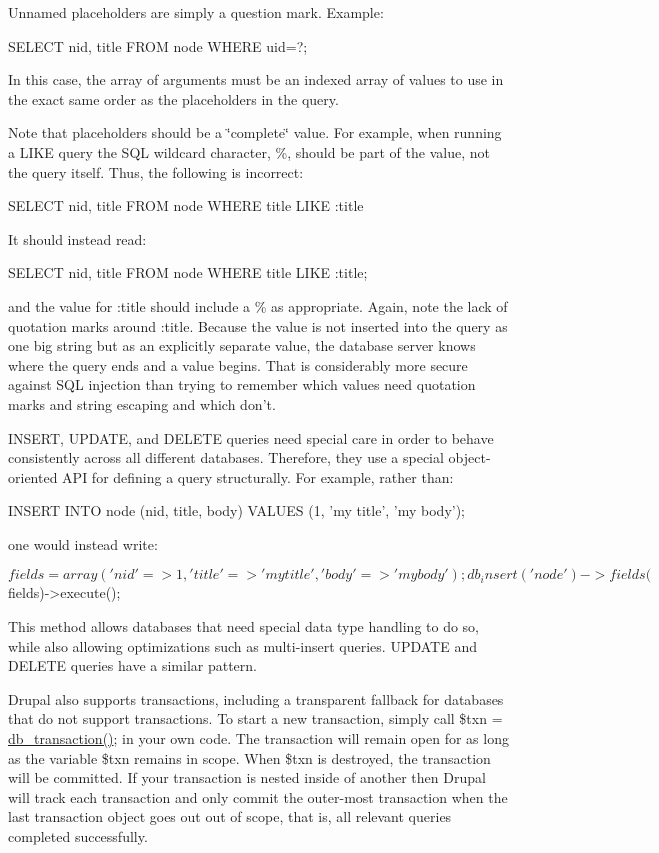 Unnamed placeholders are simply a question mark. Example: 
\begin{DoxyCode}
 SELECT nid, title FROM {node} WHERE uid=?;
\end{DoxyCode}


In this case, the array of arguments must be an indexed array of values to use in the exact same order as the placeholders in the query.

Note that placeholders should be a \char`\"{}complete\char`\"{} value. For example, when running a LIKE query the SQL wildcard character, \%, should be part of the value, not the query itself. Thus, the following is incorrect: 
\begin{DoxyCode}
 SELECT nid, title FROM {node} WHERE title LIKE :title%
\end{DoxyCode}
 It should instead read: 
\begin{DoxyCode}
 SELECT nid, title FROM {node} WHERE title LIKE :title;
\end{DoxyCode}
 and the value for :title should include a \% as appropriate. Again, note the lack of quotation marks around :title. Because the value is not inserted into the query as one big string but as an explicitly separate value, the database server knows where the query ends and a value begins. That is considerably more secure against SQL injection than trying to remember which values need quotation marks and string escaping and which don't.

INSERT, UPDATE, and DELETE queries need special care in order to behave consistently across all different databases. Therefore, they use a special object-\/oriented API for defining a query structurally. For example, rather than: 
\begin{DoxyCode}
 INSERT INTO node (nid, title, body) VALUES (1, 'my title', 'my body');
\end{DoxyCode}
 one would instead write: 
\begin{DoxyCode}
 $fields = array('nid' => 1, 'title' => 'my title', 'body' => 'my body');
 db_insert('node')->fields($fields)->execute();
\end{DoxyCode}
 This method allows databases that need special data type handling to do so, while also allowing optimizations such as multi-\/insert queries. UPDATE and DELETE queries have a similar pattern.

Drupal also supports transactions, including a transparent fallback for databases that do not support transactions. To start a new transaction, simply call \$txn = \hyperlink{group__database_gabdd0e69f5b2c63f8ad9e76f0fdf552be}{db\_\-transaction()}; in your own code. The transaction will remain open for as long as the variable \$txn remains in scope. When \$txn is destroyed, the transaction will be committed. If your transaction is nested inside of another then Drupal will track each transaction and only commit the outer-\/most transaction when the last transaction object goes out out of scope, that is, all relevant queries completed successfully.

